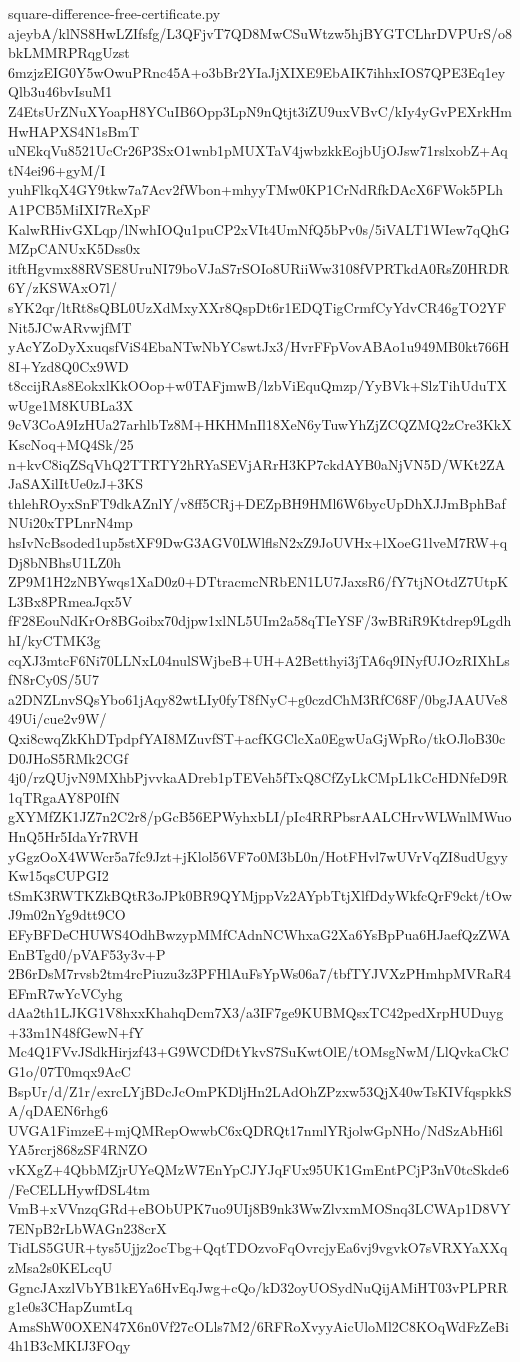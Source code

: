\documentclass[11pt]{article}
\theoremstyle{definition}
\theoremstyle{remark}
\begin{document}
\begin{filecontents*}[overwrite]{square-difference-free-certificate.py}
ajeybA/klNS8HwLZIfsfg/L3QFjvT7QD8MwCSuWtzw5hjBYGTCLhrDVPUrS/o8bkLMMRPRqgUzst
6mzjzEIG0Y5wOwuPRnc45A+o3bBr2YIaJjXIXE9EbAIK7ihhxIOS7QPE3Eq1eyQlb3u46bvIsuM1
Z4EtsUrZNuXYoapH8YCuIB6Opp3LpN9nQtjt3iZU9uxVBvC/kIy4yGvPEXrkHmHwHAPXS4N1sBmT
uNEkqVu8521UcCr26P3SxO1wnb1pMUXTaV4jwbzkkEojbUjOJsw71rslxobZ+AqtN4ei96+gyM/I
yuhFlkqX4GY9tkw7a7Acv2fWbon+mhyyTMw0KP1CrNdRfkDAcX6FWok5PLhA1PCB5MiIXI7ReXpF
KalwRHivGXLqp/lNwhIOQu1puCP2xVIt4UmNfQ5bPv0s/5iVALT1WIew7qQhGMZpCANUxK5Dss0x
itftHgvmx88RVSE8UruNI79boVJaS7rSOIo8URiiWw3108fVPRTkdA0RsZ0HRDR6Y/zKSWAxO7l/
sYK2qr/ltRt8sQBL0UzXdMxyXXr8QspDt6r1EDQTigCrmfCyYdvCR46gTO2YFNit5JCwARvwjfMT
yAcYZoDyXxuqsfViS4EbaNTwNbYCswtJx3/HvrFFpVovABAo1u949MB0kt766H8I+Yzd8Q0Cx9WD
t8ccijRAs8EokxlKkOOop+w0TAFjmwB/lzbViEquQmzp/YyBVk+SlzTihUduTXwUge1M8KUBLa3X
9cV3CoA9IzHUa27arhlbTz8M+HKHMnIl18XeN6yTuwYhZjZCQZMQ2zCre3KkXKscNoq+MQ4Sk/25
n+kvC8iqZSqVhQ2TTRTY2hRYaSEVjARrH3KP7ckdAYB0aNjVN5D/WKt2ZAJaSAXilItUe0zJ+3KS
thlehROyxSnFT9dkAZnlY/v8ff5CRj+DEZpBH9HMl6W6bycUpDhXJJmBphBafNUi20xTPLnrN4mp
hsIvNcBsoded1up5stXF9DwG3AGV0LWlflsN2xZ9JoUVHx+lXoeG1lveM7RW+qDj8bNBhsU1LZ0h
ZP9M1H2zNBYwqs1XaD0z0+DTtracmcNRbEN1LU7JaxsR6/fY7tjNOtdZ7UtpKL3Bx8PRmeaJqx5V
fF28EouNdKrOr8BGoibx70djpw1xlNL5UIm2a58qTIeYSF/3wBRiR9Ktdrep9LgdhhI/kyCTMK3g
cqXJ3mtcF6Ni70LLNxL04nulSWjbeB+UH+A2Betthyi3jTA6q9INyfUJOzRIXhLsfN8rCy0S/5U7
a2DNZLnvSQsYbo61jAqy82wtLIy0fyT8fNyC+g0czdChM3RfC68F/0bgJAAUVe849Ui/cue2v9W/
Qxi8cwqZkKhDTpdpfYAI8MZuvfST+acfKGClcXa0EgwUaGjWpRo/tkOJloB30cD0JHoS5RMk2CGf
4j0/rzQUjvN9MXhbPjvvkaADreb1pTEVeh5fTxQ8CfZyLkCMpL1kCcHDNfeD9R1qTRgaAY8P0IfN
gXYMfZK1JZ7n2C2r8/pGcB56EPWyhxbLI/pIc4RRPbsrAALCHrvWLWnlMWuoHnQ5Hr5IdaYr7RVH
yGgzOoX4WWcr5a7fc9Jzt+jKlol56VF7o0M3bL0n/HotFHvl7wUVrVqZI8udUgyyKw15qsCUPGI2
tSmK3RWTKZkBQtR3oJPk0BR9QYMjppVz2AYpbTtjXlfDdyWkfcQrF9ckt/tOwJ9m02nYg9dtt9CO
EFyBFDeCHUWS4OdhBwzypMMfCAdnNCWhxaG2Xa6YsBpPua6HJaefQzZWAEnBTgd0/pVAF53y3v+P
2B6rDsM7rvsb2tm4rcPiuzu3z3PFHlAuFsYpWs06a7/tbfTYJVXzPHmhpMVRaR4EFmR7wYcVCyhg
dAa2th1LJKG1V8hxxKhahqDcm7X3/a3IF7ge9KUBMQsxTC42pedXrpHUDuyg+33m1N48fGewN+fY
Mc4Q1FVvJSdkHirjzf43+G9WCDfDtYkvS7SuKwtOlE/tOMsgNwM/LlQvkaCkCG1o/07T0mqx9AcC
BspUr/d/Z1r/exrcLYjBDcJcOmPKDljHn2LAdOhZPzxw53QjX40wTsKIVfqspkkSA/qDAEN6rhg6
UVGA1FimzeE+mjQMRepOwwbC6xQDRQt17nmlYRjolwGpNHo/NdSzAbHi6lYA5rcrj868zSF4RNZO
vKXgZ+4QbbMZjrUYeQMzW7EnYpCJYJqFUx95UK1GmEntPCjP3nV0tcSkde6/FeCELLHywfDSL4tm
VmB+xVVnzqGRd+eBObUPK7uo9UIj8B9nk3WwZlvxmMOSnq3LCWAp1D8VY7ENpB2rLbWAGn238crX
TidLS5GUR+tys5Ujjz2ocTbg+QqtTDOzvoFqOvrcjyEa6vj9vgvkO7sVRXYaXXqzMsa2s0KELcqU
GgncJAxzlVbYB1kEYa6HvEqJwg+cQo/kD32oyUOSydNuQijAMiHT03vPLPRRg1e0s3CHapZumtLq
AmsShW0OXEN47X6n0Vf27cOLls7M2/6RFRoXvyyAicUloMl2C8KOqWdFzZeBi4h1B3cMKIJ3FOqy

\end{filecontents*}
\end{document}
